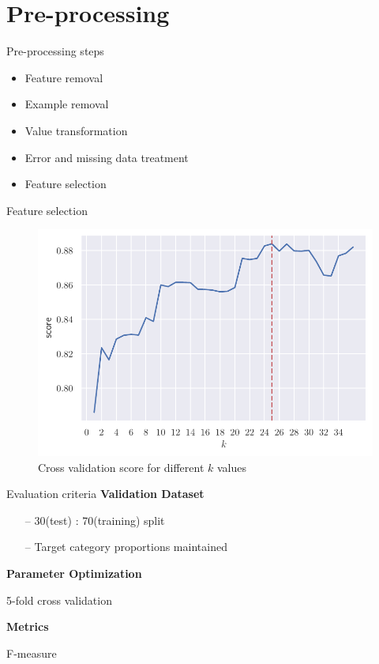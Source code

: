 \documentclass[aspectratio=169]{beamer}
\begin{document}
\section{Pre-processing}
\begin{frame}{Pre-processing steps}
\large
\begin{itemize}
     \itemsep0.5em
     \item Feature removal
     \item Example removal 
     \item Value transformation
     \item Error and missing data treatment
     \item Feature selection
\end{itemize}
\normalsize
\end{frame}

\begin{frame}{Feature selection}
    \vspace{0.75cm}
    \begin{figure}[H]
        \centering
        \includegraphics[width=0.5\linewidth]{kbest}
        \caption{Cross validation score for different $k$ values}%
        \label{fig:feature_cross}
    \end{figure}
\end{frame}

\begin{frame}{Evaluation criteria}
    \textbf{Validation Dataset}
    \small
    \begin{itemize}
    	\item[--] 30(test) : 70(training) split
    	\item[--] Target category proportions maintained
    \end{itemize}
    \normalsize
 
    \textbf{Parameter Optimization}
    
    \small
    5-fold cross validation
    
    \normalsize
    \textbf{Metrics}
    
    \small
    F-measure
    \normalsize
\end{frame}
\end{document}

